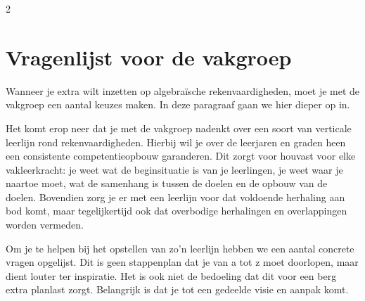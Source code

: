 \begin{multicols}{2}
\section{Vragenlijst voor de vakgroep}

Wanneer je extra wilt inzetten op algebraïsche rekenvaardigheden, moet je met de vakgroep een aantal keuzes maken. In deze paragraaf gaan we hier dieper op in.

Het komt erop neer dat je met de vakgroep nadenkt over een soort van verticale leerlijn rond rekenvaardigheden. Hierbij wil je over de leerjaren en graden heen een consistente competentieopbouw garanderen. Dit zorgt voor houvast voor elke vakleerkracht: je weet wat de beginsituatie is van je leerlingen, je weet waar je naartoe moet, wat de samenhang is tussen de doelen en de opbouw van de doelen. Bovendien zorg je er met een leerlijn voor dat voldoende herhaling aan bod komt, maar tegelijkertijd ook dat overbodige herhalingen en overlappingen worden vermeden.

Om je te helpen bij het opstellen van zo'n leerlijn hebben we een aantal concrete vragen opgelijst. Dit is geen stappenplan dat je van a tot z moet doorlopen, maar dient louter ter inspiratie. Het is ook niet de bedoeling dat dit voor een berg extra planlast zorgt. Belangrijk is dat je tot een gedeelde visie en aanpak komt.

\end{multicols}

